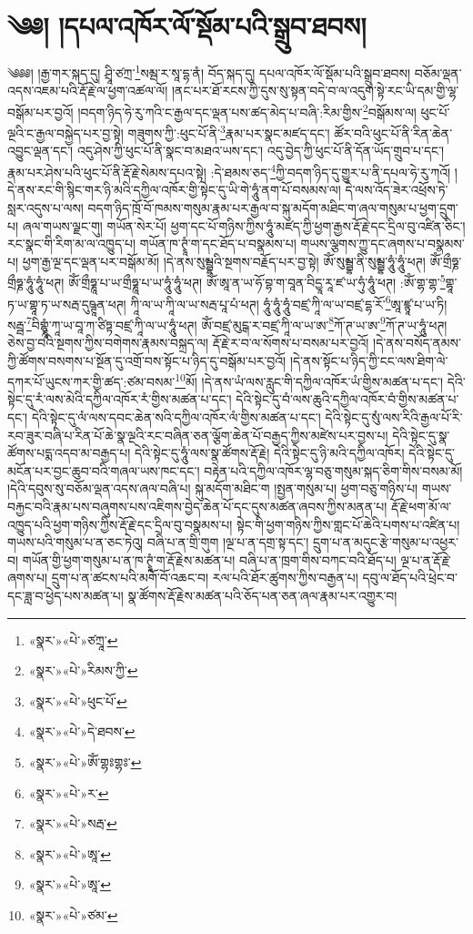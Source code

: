 \chapter{༄༅། །དཔལ་འཁོར་ལོ་སྡོམ་པའི་སྒྲུབ་ཐབས།}༄༅༅། །རྒྱ་གར་སྐད་དུ། ཤྲཱི་ཙཀྲ་\footnote{«སྣར་»«པེ་»ཙཀྲཱ་}སམྦ་ར་སཱ་དྷ་ནཾ། བོད་སྐད་དུ། དཔལ་འཁོར་ལོ་སྡོམ་པའི་སྒྲུབ་ཐབས། བཅོམ་ལྡན་འདས་འཇམ་པའི་རྡོ་རྗེ་ལ་ཕྱག་འཚལ་ལོ། །ནང་པར་ཐོ་རངས་ཀྱི་དུས་སུ་སྟན་བདེ་བ་ལ་འདུག་སྟེ་རང་ཡི་དམ་གྱི་ལྷ་བསྒོམ་པར་བྱའོ། །བདག་ཉིད་ཧེ་རུ་ཀའི་ང་རྒྱལ་དང་ལྡན་པས་ཚད་མེད་པ་བཞི་:རིམ་གྱིས་\footnote{«སྣར་»«པེ་»རིམས་ཀྱི་}བསྒོམས་ལ། ཕུང་པོ་ལྔའི་ང་རྒྱལ་བསྐྱེད་པར་བྱ་སྟེ། གཟུགས་ཀྱི་:ཕུང་པོ་ནི་\footnote{«སྣར་»«པེ་»ཕུང་པོ་}རྣམ་པར་སྣང་མཛད་དང་། ཚོར་བའི་ཕུང་པོ་ནི་རིན་ཆེན་འབྱུང་ལྡན་དང་། འདུ་ཤེས་ཀྱི་ཕུང་པོ་ནི་སྣང་བ་མཐའ་ཡས་དང་། འདུ་བྱེད་ཀྱི་ཕུང་པོ་ནི་དོན་ཡོད་གྲུབ་པ་དང་། རྣམ་པར་ཤེས་པའི་ཕུང་པོ་ནི་རྡོ་རྗེ་སེམས་དཔའ་སྟེ། :དེ་ཐམས་ཅད་\footnote{«སྣར་»«པེ་»དེ་ཐབས་}ཀྱི་བདག་ཉིད་དུ་གྱུར་པ་ནི་དཔལ་ཧེ་རུ་ཀའོ། །དེ་ནས་རང་གི་སྙིང་གར་ཉི་མའི་དཀྱིལ་འཁོར་གྱི་སྟེང་དུ་ཡི་གེ་ཧཱུཾ་ནག་པོ་བསམས་ལ། དེ་ལས་འོད་ཟེར་འཕྲོས་ཏེ་སླར་འདུས་པ་ལས། བདག་ཉིད་ཁྲོ་བོ་ཁམས་གསུམ་རྣམ་པར་རྒྱལ་བ་སྐུ་མདོག་མཐིང་ག་ཞལ་གསུམ་པ་ཕྱག་དྲུག་པ། ཞལ་གཡས་ལྗང་གུ། གཡོན་སེར་པོ། ཕྱག་དང་པོ་གཉིས་ཀྱིས་ཧཱུཾ་མཛད་ཀྱི་ཕྱག་རྒྱས་རྡོ་རྗེ་དང་དྲིལ་བུ་འཛིན་ཅིང་། རང་སྣང་གི་རིག་མ་ལ་འཁྱུད་པ། གཡོན་ཁ་ཊྭཱཾ་ག་དང་ཐོད་པ་བསྣམས་པ། གཡས་ལྕགས་ཀྱུ་དང་ཞགས་པ་བསྣམས་པ། ཕྱག་རྒྱ་ལྔ་དང་ལྡན་པར་བསྒོམ་མོ། །དེ་ནས་སུམྦྷའི་སྔགས་བརྗོད་པར་བྱ་སྟེ། ཨོཾ་སུམྦྷ་ནི་སུམྦྷ་ཧཱུཾ་ཧཱུཾ་ཕཊ། ཨོཾ་གྲྀཧྞ་གྲྀཧྞ་ཧཱུཾ་ཧཱུཾ་ཕཊ། ཨོཾ་གྲྀཧྞཱ་པ་ཡ་གྲྀཧྞཱ་པ་ཡ་ཧཱུཾ་ཧཱུཾ་ཕཊ། ཨོཾ་ཨཱ་ན་ཡ་ཧོ་བྷ་ག་བཱན་བིདྱཱ་རཱ་ཛ་ཡ་ཧུཾ་ཧཱུཾ་ཕཊ། :ཨོཾ་གྷ་གྷ་\footnote{«སྣར་»«པེ་»ཨོཾ་གྷཿགྷཿ་}གྷཱ་ཏ་ཡ་གྷཱ་ཏ་ཡ་སརྦ་དུཥྚཱན་ཕཊ། ཀཱི་ལ་ཡ་ཀཱི་ལ་ཡ་སརྦ་པཱ་པཾ་ཕཊ། ཧཱུཾ་ཧཱུཾ་ཧཱུཾ་བཛྲ་ཀཱི་ལ་ཡ་བཛྲ་དྷ་རོ་\footnote{«སྣར་»«པེ་»ར་}ཨཱ་ཛྙཱ་པ་ཡ་ཏི། སརྦྦ་\footnote{«སྣར་»«པེ་»སརྦ་}བིགྷྣཱཾ་ཀཱ་ཡ་བཱ་ཀ་ཙིཏྟ་བཛྲ་ཀཱི་ལ་ཡ་ཧཱུཾ་ཕཊ། ཨོཾ་བཛྲ་མུངྒ་ར་བཛྲ་ཀཱི་ལ་ཡ་ཨ་\footnote{«སྣར་»«པེ་»ཨཱ་}ཀོ་ཊ་ཡ་ཨ་\footnote{«སྣར་»«པེ་»ཨཱ་}ཀོ་ཊ་ཡ་ཧཱུཾ་ཕཊ། ཅེས་བྱ་བའི་སྔགས་ཀྱིས་བགེགས་རྣམས་བསྐྲད་ལ། རྡོ་རྗེ་ར་བ་ལ་སོགས་པ་བསམ་པར་བྱའོ། །དེ་ནས་བསོད་ནམས་ཀྱི་ཚོགས་བསགས་པ་སྔོན་དུ་འགྲོ་བས་སྟོང་པ་ཉིད་དུ་བསྒོམ་པར་བྱའོ། །དེ་ནས་སྟོང་པ་ཉིད་ཀྱི་ངང་ལས་ཐིག་ལེ་དཀར་པོ་ཡུངས་ཀར་གྱི་ཚད་:ཙམ་བསམ་\footnote{«སྣར་»«པེ་»ཙམ་}མོ། །དེ་ནས་ཡཾ་ལས་རླུང་གི་དཀྱིལ་འཁོར་ཡཾ་གྱིས་མཚན་པ་དང་། དེའི་སྟེང་དུ་རཾ་ལས་མེའི་དཀྱིལ་འཁོར་རཾ་གྱིས་མཚན་པ་དང་། དེའི་སྟེང་དུ་བཾ་ལས་ཆུའི་དཀྱིལ་འཁོར་བཾ་གྱིས་མཚན་པ་དང་། དེའི་སྟེང་དུ་ལཾ་ལས་དབང་ཆེན་སའི་དཀྱིལ་འཁོར་ལཾ་གྱིས་མཚན་པ་དང་། དེའི་སྟེང་དུ་སུཾ་ལས་རིའི་རྒྱལ་པོ་རི་རབ་ཟུར་བཞི་པ་རིན་པོ་ཆེ་སྣ་ལྔའི་རང་བཞིན་ཅན་ལྕོག་ཆེན་པོ་བརྒྱད་ཀྱིས་མཛེས་པར་བྱས་པ། དེའི་སྟེང་དུ་སྣ་ཚོགས་པདྨ་འདབ་མ་བརྒྱད་པ། དེའི་སྟེང་དུ་ཧཱུཾ་ལས་སྣ་ཚོགས་རྡོ་རྗེ། དེའི་སྟེང་དུ་ཉི་མའི་དཀྱིལ་འཁོར། དེའི་སྟེང་དུ་མངོན་པར་བྱང་ཆུབ་བའི་གཞལ་ཡས་ཁང་དང་། བརྟེན་པའི་དཀྱིལ་འཁོར་ལྷ་བཅུ་གསུམ་སྐད་ཅིག་གིས་བསམ་མོ། །དེའི་དབུས་སུ་བཅོམ་ལྡན་འདས་ཞལ་བཞི་པ། སྐུ་མདོག་མཐིང་ག །སྤྱན་གསུམ་པ། ཕྱག་བཅུ་གཉིས་པ། གཡས་བརྐྱང་བའི་རྣམ་པས་བཞུགས་པས་འཇིགས་བྱེད་ཆེན་པོ་དང་དུས་མཚན་ཞབས་ཀྱིས་མནན་པ། རྡོ་རྗེ་ཕག་མོ་ལ་འཁྱུད་པའི་ཕྱག་གཉིས་ཀྱིས་རྡོ་རྗེ་དང་དྲིལ་བུ་བསྣམས་པ། སྟེང་གི་ཕྱག་གཉིས་ཀྱིས་གླང་པོ་ཆེའི་པགས་པ་འཛིན་པ། གཡས་པའི་གསུམ་པ་ན་ཅང་ཏེའུ། བཞི་པ་ན་གྲི་གུག །ལྔ་པ་ན་དགྲ་སྟ་དང་། དྲུག་པ་ན་མདུང་རྩེ་གསུམ་པ་འཕྱར་བ། གཡོན་གྱི་ཕྱག་གསུམ་པ་ན་ཁ་ཊྭཱཾ་ག་རྡོ་རྗེས་མཚན་པ། བཞི་པ་ན་ཁྲག་གིས་བཀང་བའི་ཐོད་པ། ལྔ་པ་ན་རྡོ་རྗེ་ཞགས་པ། དྲུག་པ་ན་ཚངས་པའི་མགོ་བོ་འཆང་བ། རལ་པའི་ཐོར་ཚུགས་ཀྱིས་བརྒྱན་པ། དབུ་ལ་ཐོད་པའི་ཕྲེང་བ་དང་ཟླ་བ་ཕྱེད་པས་མཚན་པ། སྣ་ཚོགས་རྡོ་རྗེས་མཚན་པའི་ཅོད་པན་ཅན་ཞལ་རྣམ་པར་འགྱུར་བ། 